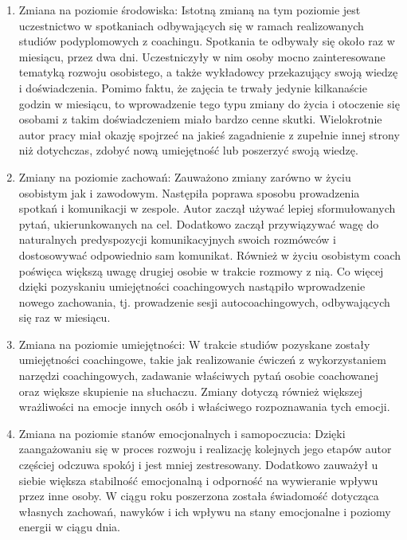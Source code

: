 \begin{enumerate}
  \item Zmiana na poziomie środowiska: Istotną zmianą na tym poziomie jest uczestnictwo w spotkaniach odbywających się
      w ramach realizowanych studiów podyplomowych z coachingu. Spotkania te odbywały się około raz w miesiącu, przez dwa dni.
      Uczestniczyły w nim osoby mocno zainteresowane tematyką rozwoju osobistego, a także wykładowcy przekazujący swoją
      wiedzę i doświadczenia. Pomimo faktu, że zajęcia te trwały jedynie kilkanaście godzin w miesiącu, to wprowadzenie
      tego typu zmiany do życia i otoczenie się osobami z takim doświadczeniem miało bardzo cenne skutki. Wielokrotnie
      autor pracy miał okazję spojrzeć na jakieś zagadnienie z zupełnie innej strony niż dotychczas, zdobyć nową umiejętność
      lub poszerzyć swoją wiedzę.

  \item Zmiany na poziomie zachowań: Zauważono zmiany zarówno w życiu osobistym jak i zawodowym. Następiła poprawa sposobu
      prowadzenia spotkań i komunikacji w zespole. Autor zaczął używać lepiej sformułowanych pytań, ukierunkowanych na cel.
      Dodatkowo zaczął przywiązywać wagę do naturalnych predyspozycji komunikacyjnych swoich rozmówców i dostosowywać
      odpowiednio sam komunikat. Również w życiu osobistym coach poświęca większą uwagę drugiej osobie w trakcie rozmowy
      z nią. Co więcej dzięki pozyskaniu umiejętności coachingowych nastąpiło wprowadzenie nowego zachowania, tj. prowadzenie
      sesji autocoachingowych, odbywających się raz w miesiącu.

  \item Zmiana na poziomie umiejętności: W trakcie studiów pozyskane zostały umiejętności coachingowe, takie jak realizowanie
      ćwiczeń z wykorzystaniem narzędzi coachingowych, zadawanie właściwych pytań osobie coachowanej oraz większe skupienie na
      słuchaczu. Zmiany dotyczą również większej wrażliwości na emocje innych osób i właściwego rozpoznawania tych emocji.

  \item Zmiana na poziomie stanów emocjonalnych i samopoczucia: Dzięki zaangażowaniu się w proces rozwoju i realizację kolejnych
      jego etapów autor częściej odczuwa spokój i jest mniej zestresowany. Dodatkowo zauważył u siebie większa stabilność emocjonalną
      i odporność na wywieranie wpływu przez inne osoby. W ciągu roku poszerzona została świadomość dotycząca własnych zachowań, nawyków
      i ich wpływu na stany emocjonalne i poziomy energii w ciągu dnia.


\end{enumerate}
